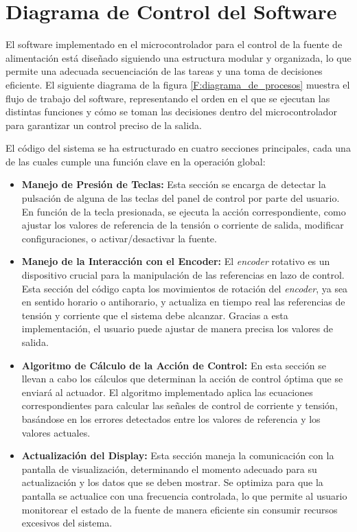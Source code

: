 \section{Diagrama de Control del Software}
El software implementado en el microcontrolador para el control de la fuente de alimentación está diseñado siguiendo una estructura modular y organizada, lo que permite una adecuada secuenciación de las tareas y una toma de decisiones eficiente. El siguiente diagrama de la figura \ref{F:diagrama_de_procesos} muestra el flujo de trabajo del software, representando el orden en el que se ejecutan las distintas funciones y cómo se toman las decisiones dentro del microcontrolador para garantizar un control preciso de la salida.\par
El código del sistema se ha estructurado en cuatro secciones principales, cada una de las cuales cumple una función clave en la operación global:\par
\begin{itemize}
    \item \textbf{Manejo de Presión de Teclas:} Esta sección se encarga de detectar la pulsación de alguna de las teclas del panel de control por parte del usuario. En función de la tecla presionada, se ejecuta la acción correspondiente, como ajustar los valores de referencia de la tensión o corriente de salida, modificar configuraciones, o activar/desactivar la fuente.
    \item \textbf{Manejo de la Interacción con el Encoder:} El \textit{encoder} rotativo es un dispositivo crucial para la manipulación de las referencias en lazo de control. Esta sección del código capta los movimientos de rotación del \textit{encoder}, ya sea en sentido horario o antihorario, y actualiza en tiempo real las referencias de tensión y corriente que el sistema debe alcanzar. Gracias a esta implementación, el usuario puede ajustar de manera precisa los valores de salida.
    \item \textbf{Algoritmo de Cálculo de la Acción de Control:} En esta sección se llevan a cabo los cálculos que determinan la acción de control óptima que se enviará al actuador. El algoritmo implementado aplica las ecuaciones correspondientes para calcular las señales de control de corriente y tensión, basándose en los errores detectados entre los valores de referencia y los valores actuales.
    \item \textbf{Actualización del Display:} Esta sección maneja la comunicación con la pantalla de visualización, determinando el momento adecuado para su actualización y los datos que se deben mostrar. Se optimiza para que la pantalla se actualice con una frecuencia controlada, lo que permite al usuario monitorear el estado de la fuente de manera eficiente sin consumir recursos excesivos del sistema.
\end{itemize}

